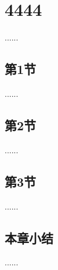 
\chapter{4444}

......

\section{第1节}

......

\section{第2节}

......

\section{第3节}

......

\section{本章小结}

......
